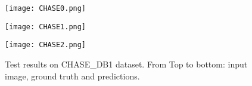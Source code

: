 \documentclass{article}
\begin{document}
\begin{figure}[!htb]
    \centering
    \begin{minipage}{0.14\textwidth}
        \centering
        \texttt{[image: CHASE0.png]}
    \end{minipage}\begin{minipage}{0.14\textwidth}
        \centering
        \texttt{[image: CHASE1.png]}
    \end{minipage}\begin{minipage}{0.14\textwidth}
        \centering
        \texttt{[image: CHASE2.png]}
    \end{minipage}\caption{
    \footnotesize{Test results on CHASE\_DB1 dataset. From Top to bottom: input image, ground truth and predictions.}
    }
    \label{ChaseImage}
\end{figure} 
\end{document}

